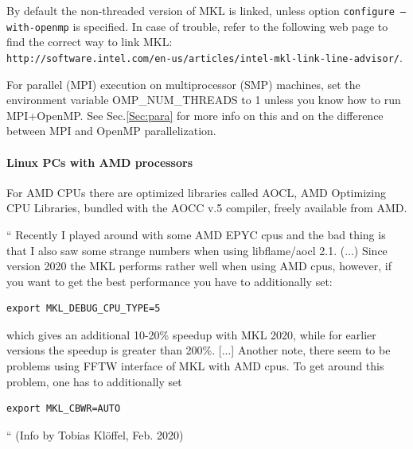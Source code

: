 \documentclass[12pt,a4paper]{article}
\begin{document}
By default the non-threaded version of MKL is linked, unless option
\texttt{configure --with-openmp} is specified. In case of trouble,
refer to the following web page to find the correct way to link MKL:\\
\texttt{http://software.intel.com/en-us/articles/intel-mkl-link-line-advisor/}.

For parallel (MPI) execution on multiprocessor (SMP) machines, set the
environment variable OMP\_NUM\_THREADS to 1 unless you know how to run
MPI+OpenMP. See Sec.\ref{Sec:para} for more info on this
and on the difference between MPI and OpenMP parallelization.

\paragraph{Linux PCs with AMD processors}
For AMD CPUs there are optimized libraries called AOCL, AMD Optimizing CPU 
Libraries, bundled with the AOCC v.5 compiler, freely available from AMD.

`` Recently I played around with some AMD EPYC cpus and the bad thing
is that I also saw some strange numbers when using libflame/aocl 2.1.
(...) Since version 2020 the MKL performs rather well when using AMD cpus,
 however, if you want to get the best performance you have to additionally set:
\begin{verbatim}
export MKL_DEBUG_CPU_TYPE=5
\end{verbatim}
which gives an additional 10-20\% speedup with MKL 2020,
while for earlier versions the speedup is greater than 200\%.
[...] Another note, there seem to be problems using FFTW interface
of MKL with  AMD cpus. To get around this problem, one has to
additionally set
\begin{verbatim}
export MKL_CBWR=AUTO
\end{verbatim}
`` (Info by Tobias Kl\"offel, Feb. 2020)
\end{document}
